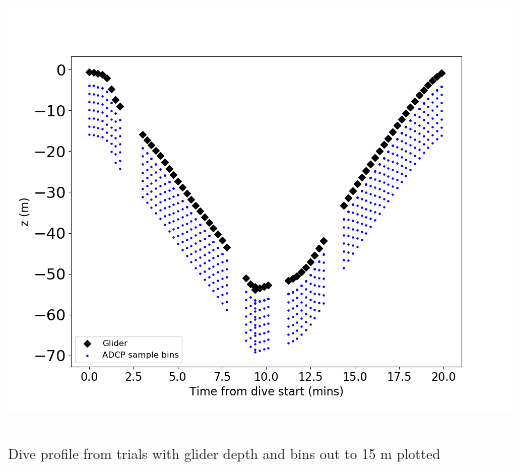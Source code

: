\documentclass[unknownkeysallowed,usepdftitle=false]{beamer}
\begin{document}
\begin{frame}\label{sawtooth}
\vspace*{-1.2mm}    
\begin{center}
\includegraphics[trim=0 0 0 50,clip,width=0.8\paperwidth]{figure/sawtooth.png}
\end{center}

\vspace*{-5.2mm}
\begin{columns}
\begin{column}[t]{0.9\textwidth}
Dive profile from trials with glider depth and bins out to 15 m plotted
\end{column}
\end{columns}


  
\end{frame}
\end{document}
